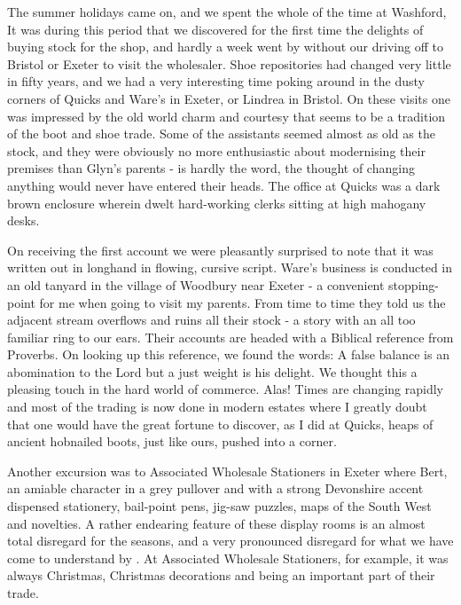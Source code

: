 
The summer holidays came on, and we spent the whole of the time at Washford, It was during this period that we discovered for the first time the delights of buying stock for the shop, and hardly a week went by without our driving off to Bristol or Exeter to visit the wholesaler. Shoe repositories had changed very little in fifty years, and we had a very interesting time poking around in the dusty corners of Quicks and Ware's in Exeter, or Lindrea in Bristol. On these visits one was impressed by the old world charm and courtesy that seems to be a tradition of the boot and shoe trade. Some of the assistants seemed almost as old as the stock, and they were obviously no more enthusiastic about modernising their premises than Glyn's parents -  is hardly the word, the thought of changing anything would never have entered their heads. The office at Quicks was a dark brown enclosure wherein dwelt hard-working clerks sitting at high mahogany desks.

On receiving the first account we were pleasantly surprised to note that it was written out in longhand in flowing, cursive script. Ware's business is conducted in an old tanyard in the village of Woodbury near Exeter - a convenient stopping-point for me when going to visit my parents. From time to time they told us the adjacent stream overflows and ruins all their stock - a story with an all too familiar ring to our ears. Their accounts are headed with a Biblical reference from Proverbs. On looking up this reference, we found the words: A false balance is an abomination to the Lord but a just weight is his delight. We thought this a pleasing touch in the hard world of commerce. Alas! Times are changing rapidly and most of the trading is now done in modern estates where I greatly doubt that one would have the great fortune to discover, as I did at Quicks, heaps of ancient hobnailed boots, just like ours, pushed into a corner.

Another excursion was to Associated Wholesale Stationers in Exeter where Bert, an amiable character in a grey pullover and with a strong Devonshire accent dispensed stationery, bail-point pens, jig-saw puzzles, maps of the South West and novelties. A rather endearing feature of these display rooms is an almost total disregard for the seasons, and a very pronounced disregard for what we have come to understand by . At Associated Wholesale Stationers, for example, it was always Christmas, Christmas decorations and  being an important part of their trade.

